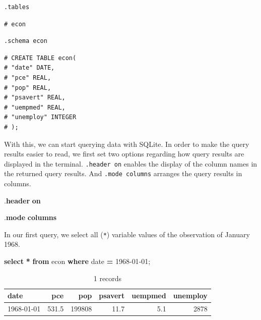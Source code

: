 \documentclass[
  12pt,
]{style/krantz}
\newenvironment{Shaded}{\begin{snugshade}}{\end{snugshade}}
\newcommand{\DataTypeTok}[1]{\textcolor[rgb]{0.13,0.29,0.53}{#1}}
\newcommand{\KeywordTok}[1]{\textcolor[rgb]{0.13,0.29,0.53}{\textbf{#1}}}
\newcommand{\NormalTok}[1]{#1}
\newcommand{\OperatorTok}[1]{\textcolor[rgb]{0.81,0.36,0.00}{\textbf{#1}}}
\newcommand{\StringTok}[1]{\textcolor[rgb]{0.31,0.60,0.02}{#1}}
\begin{document}
\begin{verbatim}
.tables
\end{verbatim}

\begin{verbatim}
# econ
\end{verbatim}

\begin{verbatim}
.schema econ
\end{verbatim}

\begin{verbatim}
# CREATE TABLE econ(
# "date" DATE,
# "pce" REAL,
# "pop" REAL,
# "psavert" REAL,
# "uempmed" REAL,
# "unemploy" INTEGER
# );
\end{verbatim}

With this, we can start querying data with SQLite. In order to make the query results easier to read, we first set two options regarding how query results are displayed in the terminal. \texttt{.header\ on} enables the display of the column names in the returned query results. And \texttt{.mode\ columns} arranges the query results in columns.

\begin{Shaded}
\begin{Highlighting}[]
\NormalTok{.}\KeywordTok{header} \KeywordTok{on}
\end{Highlighting}
\end{Shaded}

\begin{Shaded}
\begin{Highlighting}[]
\NormalTok{.}\KeywordTok{mode} \KeywordTok{columns}
\end{Highlighting}
\end{Shaded}

In our first query, we select all (\texttt{*}) variable values of the observation of January 1968.

\begin{Shaded}
\begin{Highlighting}[]
\KeywordTok{select} \OperatorTok{*} \KeywordTok{from}\NormalTok{ econ }\KeywordTok{where} \DataTypeTok{date} \OperatorTok{=} \StringTok{\textquotesingle{}1968{-}01{-}01\textquotesingle{}}\NormalTok{;}
\end{Highlighting}
\end{Shaded}

\begin{table}

\caption{\label{tab:unnamed-chunk-62}1 records}
\centering
\begin{tabular}[t]{l|r|r|r|r|r}
\hline
date & pce & pop & psavert & uempmed & unemploy\\
\hline
1968-01-01 & 531.5 & 199808 & 11.7 & 5.1 & 2878\\
\hline
\end{tabular}
\end{table}
\end{document}
